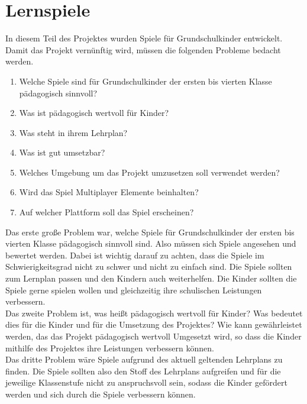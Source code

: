 \section{Lernspiele}

In diesem Teil des Projektes wurden Spiele für Grundschulkinder entwickelt. Damit das Projekt vernünftig wird, müssen die folgenden Probleme bedacht werden.
\begin{enumerate}
    \item Welche Spiele sind für Grundschulkinder der ersten bis vierten Klasse pädagogisch sinnvoll?
    \item Was ist pädagogisch wertvoll für Kinder?
    \item Was steht in ihrem Lehrplan?
    \item Was ist gut umsetzbar?
    \item Welches Umgebung um das Projekt umzusetzen soll verwendet werden?
    \item Wird das Spiel Multiplayer Elemente beinhalten?
    \item Auf welcher Plattform soll das Spiel erscheinen?
\end{enumerate}


Das erste große Problem war, welche Spiele für Grundschulkinder der ersten bis vierten Klasse pädagogisch sinnvoll sind. Also müssen sich Spiele angesehen und bewertet werden. Dabei ist wichtig darauf zu achten, dass die Spiele im Schwierigkeitsgrad nicht zu schwer und nicht zu einfach sind. Die Spiele sollten zum Lernplan passen und den Kindern auch weiterhelfen. Die Kinder sollten die Spiele gerne spielen wollen und gleichzeitig ihre schulischen Leistungen verbessern.
\\

Das zweite Problem ist, was heißt pädagogisch wertvoll für Kinder? Was bedeutet dies für die Kinder und für die Umsetzung des Projektes? Wie kann gewährleistet werden, das das Projekt pädagogisch wertvoll Umgesetzt wird, so dass die Kinder mithilfe des Projektes ihre Leistungen verbessern können.
\\

Das dritte Problem wäre Spiele aufgrund des aktuell geltenden Lehrplans zu finden. Die Spiele sollten also den Stoff des Lehrplans aufgreifen und für die jeweilige Klassenstufe nicht zu anspruchsvoll sein, sodass die Kinder gefördert werden und sich durch die Spiele verbessern können.
\\


